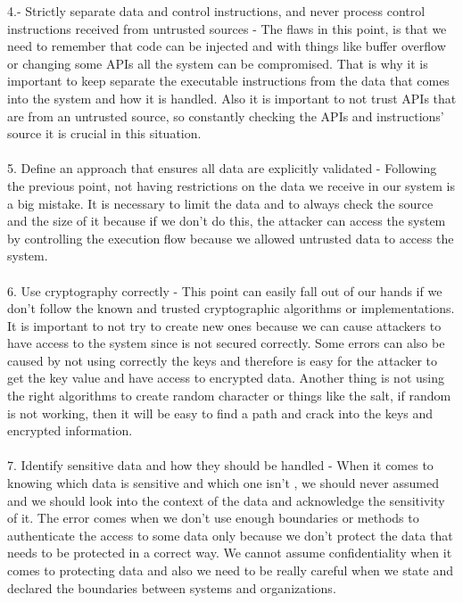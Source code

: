 \documentclass[12pt]{article}
\begin{document}
\begin{description}
4.- Strictly separate data and control instructions, and never process control instructions received from untrusted sources - The flaws in this point, is that we need to remember that code can be injected and with things like buffer overflow or changing some APIs all the system can be compromised. That is why it is important to keep separate the executable instructions from the data that comes into the system and how it is handled. Also it is important to not trust APIs that are from an untrusted source, so constantly checking the APIs and instructions' source it is crucial in this situation.  \\\\

5. Define an approach that ensures all data are explicitly validated - Following the previous point, not having restrictions on the data we receive in our system is a big mistake. It is necessary to limit the data and to always check the source and the size of it because if we don't do this, the attacker can access the system by controlling the execution flow  because we allowed untrusted data to access the system. \\\\

6. Use cryptography correctly - This point can easily fall out of our hands if we don't follow the known and trusted cryptographic algorithms or implementations. It is important to not try to create new ones because we can cause attackers to have access to the system since is not secured correctly. Some errors can also be caused by not using correctly the keys and therefore is easy for the attacker to get the key value and have access to encrypted data. Another thing is not using the right algorithms to create random character or things like the salt, if random is not working, then it will be easy to find a path and crack into the keys and encrypted information.  \\\\

7. Identify sensitive data and how they should be handled - When it comes to knowing which data is sensitive and which one isn't , we should never assumed and we should look into the context of the data and acknowledge the sensitivity of it. The error comes when we don't use enough boundaries or methods to authenticate the access to some data only because we don't protect the data that needs to be protected in a correct way. We cannot assume confidentiality when it comes to protecting data and also we need to be really careful when we state and declared the boundaries between systems and organizations. \\ \\


\end{description}
\end{document}
